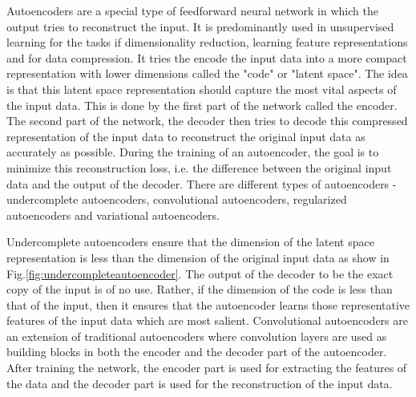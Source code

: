 Autoencoders are a special type of feedforward neural network in which the output tries to reconstruct the input. It is predominantly used in unsupervised learning for the tasks if dimensionality reduction, learning feature representations and for data compression. It tries the encode the input data into a more compact representation with lower dimensions called the "code"\cite{Goodfellow-et-al-2016} or "latent space". The idea is that this latent space representation should capture the most vital aspects of the input data. This is done by the first part of the network called the encoder. The second part of the network, the decoder then tries to decode this compressed representation of the input data to reconstruct the original input data as accurately as possible. During the training of an autoencoder, the goal is to minimize this reconstruction loss, i.e. the difference between the original input data and the output of the decoder. There are different types of autoencoders - undercomplete autoencoders, convolutional autoencoders, regularized autoencoders and variational autoencoders.

\vspace{5mm}


Undercomplete autoencoders ensure that the dimension of the latent space representation is less than the dimension of the original input data as show in Fig.\ref{fig:undercompleteautoencoder}. The output of the decoder to be the exact copy of the input is of no use. Rather, if the dimension of the code is less than that of the input, then it ensures that the autoencoder learns those representative features of the input data which are most salient\cite{Goodfellow-et-al-2016}. Convolutional autoencoders are an extension of traditional autoencoders where convolution layers are used as building blocks in both the encoder and the decoder part of the autoencoder. After training the network, the encoder part is used for extracting the features of the data and the decoder part is used for the reconstruction of the input data.

\vspace{5mm}

